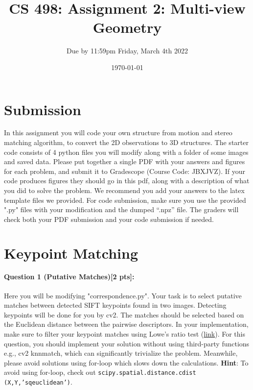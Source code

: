 \documentclass[11pt]{article}
\begin{document}
\author{Due by 11:59pm Friday, March 4th 2022}
\title{CS 498: Assignment 2: Multi-view Geometry}
\date{\today}
\maketitle

\medskip


\section*{Submission}
In this assignment you will code your own structure from motion and stereo matching algorithm, to convert the 2D observations to 3D structures. The starter code consists of 4 python files you will modify along with a folder of some images and saved data. Please put together a single PDF with your answers and figures for each problem, and submit it to Gradescope (Course Code: JBXJVZ). If your code produces figures they should go in this pdf, along with a description of what you did to solve the problem. We recommend you add your answers to the latex template files we provided. For code submission, make sure you use the provided ".py" files with your modification and the dumped ``.npz'' file. The graders will check both your PDF submission and your code submission if needed. 

\section*{Keypoint Matching} 
\paragraph{Question 1 (Putative Matches)[2 pts]:} Here you will be modifying "correspondence.py". Your task is to select putative matches between detected SIFT keypoints found in two images. Detecting keypoints will be done for you by cv2. The matches should be selected based on the Euclidean distance between the pairwise descriptors. In your implementation, make sure to filter your keypoint matches using Lowe's ratio test (\href{https://stackoverflow.com/questions/51197091/how-does-the-lowes-ratio-test-work}{link}).  For this question, you should implement your solution without using third-party functions e.g., cv2 knnmatch, which can significantly trivialize the problem. Meanwhile, please avoid solutions using for-loop which slows down the calculations. \textbf{Hint}: To avoid using for-loop, check out \texttt{scipy.spatial.distance.cdist (X,Y,'sqeuclidean')}.
\end{document}
